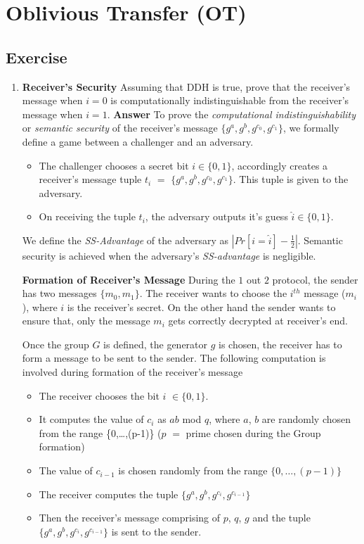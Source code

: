 \documentclass{article}
\begin{document}
\section*{Oblivious Transfer (OT)}
\subsection*{Exercise}
\begin{enumerate}

\item \textbf{Receiver's Security} Assuming that DDH is true, prove that the receiver's message when $i = 0$ is computationally indistinguishable from the receiver's message when $i = 1$. \newline
\textbf{Answer}
To prove the \textit{computational indistinguishability} or \textit{semantic security} of the receiver's message $\{g^a,g^b,g^{c_0},g^{c_1}\}$, we formally define a game between a challenger and an adversary.

\begin{itemize}
\item The challenger chooses a secret bit $i \in \{0,1\}$, accordingly creates a receiver's message tuple $t_i$ $=$ $\{g^a,g^b,g^{c_0},g^{c_1}\}$. This tuple is given to the adversary.
\item On receiving the tuple $t_i$, the adversary outputs it's guess $\hat{i} \in \{0,1\}$.
\end{itemize}

We define the \textit{SS-Advantage} of the adversary as $|Pr[i = \hat{i}] - \frac{1}{2}|$. Semantic security is achieved when the adversary's \textit{SS-advantage} is negligible.

\textbf{Formation of Receiver's Message}
During the $1$ out $2$ protocol, the sender has two messages $\{m_0, m_1\}$. The receiver wants to choose the $i^{th}$ message ($m_i$), where $i$ is the receiver's secret. On the other hand the sender wants to ensure that, only the message $m_i$ gets correctly decrypted at receiver's end.

Once the group $G$ is defined, the generator $g$ is chosen, the receiver has to form a message to be sent to the sender. The following computation is involved during formation of the receiver's message

\begin{itemize}
\item The receiver chooses the bit $i$ $\in \{0,1\}$.
\item It computes the value of $c_i$ as $ab$ mod $q$, where $a$, $b$ are randomly chosen from the range \{0,\ldots,(p-1)\} ($p$ $=$ prime chosen during the Group formation)
\item The value of $c_{i-1}$ is chosen randomly from the range $\{0,\ldots,(p-1)\}$
\item The receiver computes the tuple $\{g^a,g^b,g^{c_i},g^{c_{i-1}}\}$
\item Then the receiver's message comprising of $p$, $q$, $g$ and the tuple $\{g^a,g^b,g^{c_i},g^{c_{i-1}}\}$ is sent to the sender.
\end{itemize}


\end{enumerate}
\end{document}
